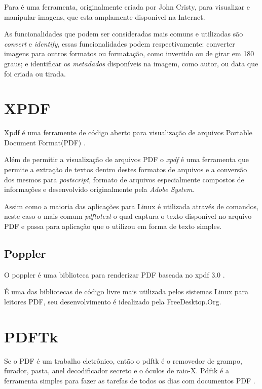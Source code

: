 Para \cite{TESLA} é uma ferramenta, originalmente criada por John Cristy, para visualizar e manipular imagens, que esta amplamente disponível na Internet.

As funcionalidades que podem ser consideradas mais comuns e utilizadas são \textit{convert} e \textit{identify}, essas funcionalidades podem respectivamente: converter imagens para outros formatos ou formatação, como invertido ou de girar em 180 graus; e identificar os \textit{metadados} disponíveis na imagem, como autor, ou data que foi criada ou tirada.

\section{XPDF}

Xpdf é uma ferramente de código aberto para visualização de arquivos Portable Document Format(PDF) \cite{GLYPH-COG}.

Além de permitir a visualização de arquivos PDF o \textit{xpdf} é uma ferramenta que permite a extração de textos dentro destes formatos de arquivos e a conversão dos mesmos para \textit{postscript}, formato de arquivos especialmente compostos de informações e desenvolvido originalmente pela \textit{Adobe System}.

Assim como a maioria das aplicações para Linux é utilizada através de comandos, neste caso o mais comum \textit{pdftotext} o qual captura o texto disponível no arquivo PDF e passa para aplicação que o utilizou em forma de texto simples.

\subsection{Poppler}

O poppler é uma biblioteca para renderizar PDF baseada no xpdf 3.0 \cite{JOHNSON}.

É uma das bibliotecas de código livre mais utilizada pelos sistemas Linux para leitores PDF, seu desenvolvimento é idealizado pela FreeDesktop.Org.

\section{PDFTk}

Se o PDF é um trabalho eletrônico, então o pdftk é o removedor de grampo, furador, pasta, anel decodificador secreto e o óculos de raio-X. Pdftk é a ferramenta simples para fazer as tarefas de todos os dias com documentos PDF \cite{STEWARD}.

